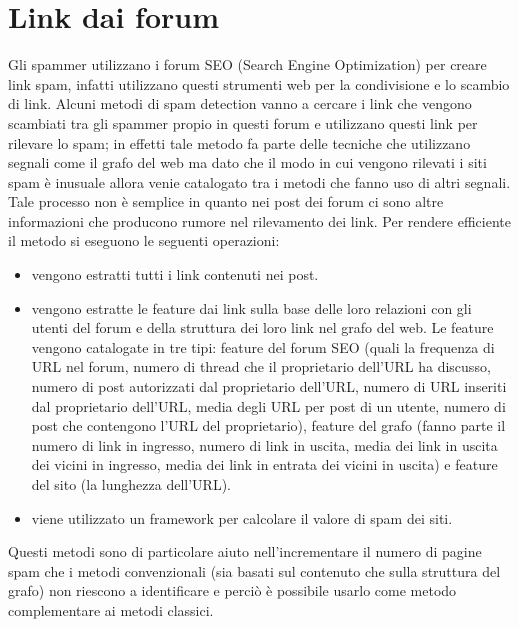\section{Link dai forum}
Gli spammer utilizzano i forum SEO (Search Engine Optimization) per creare link spam, infatti utilizzano questi strumenti web per la condivisione e lo scambio di link. Alcuni metodi di spam detection vanno a cercare i link che vengono scambiati tra gli spammer propio in questi forum \cite{Cheng:2011:LWS:1935826.1935902} e utilizzano questi link per rilevare lo spam; in effetti tale metodo fa parte delle tecniche che utilizzano segnali come il grafo del web ma dato che il modo in cui vengono rilevati i siti spam è inusuale allora venie catalogato tra i metodi che fanno uso di altri segnali. Tale processo non è semplice in quanto nei post dei forum ci sono altre informazioni che producono rumore nel rilevamento dei link. Per rendere efficiente il metodo si eseguono le seguenti operazioni:
\begin{itemize}
 \item vengono estratti tutti i link contenuti nei post.
 \item vengono estratte le feature dai link sulla base delle loro relazioni con gli utenti del forum e della struttura dei loro link nel grafo del web. Le feature vengono catalogate in tre tipi: feature del forum SEO (quali la frequenza di URL nel forum, numero di thread che il proprietario dell'URL ha discusso, numero di post autorizzati dal proprietario dell'URL, numero di URL inseriti dal proprietario dell'URL, media degli URL per post di un utente, numero di post che contengono l'URL del proprietario), feature del grafo (fanno parte il numero di link in ingresso, numero di link in uscita, media dei link in uscita dei vicini in ingresso, media dei link in entrata dei vicini in uscita) e feature del sito (la lunghezza dell'URL). 
 \item viene utilizzato un framework per calcolare il valore di spam dei siti.
\end{itemize}
Questi metodi sono di particolare aiuto nell'incrementare il numero di pagine spam che i metodi convenzionali (sia basati sul contenuto che sulla struttura del grafo) non riescono a identificare  e perciò è possibile usarlo come metodo complementare ai metodi classici.

